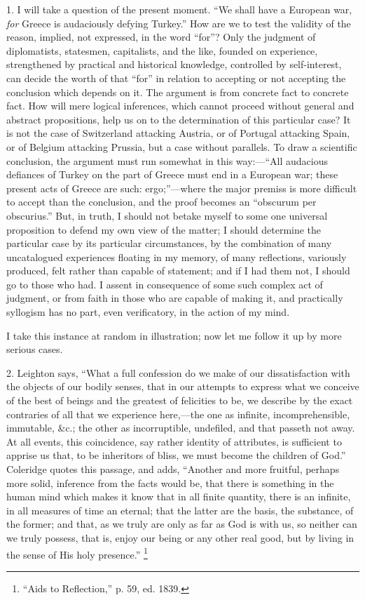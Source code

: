 1. I will take a question of the present moment. ``We shall
have a European war, \emph{for} Greece is audaciously defying Turkey.''
How are we to test the validity of the reason, implied, not expressed,
in the word ``for''? Only the judgment of diplomatists,
statesmen, capitalists, and the like, founded on experience,
strengthened by practical and historical knowledge, controlled by
self-interest, can decide the worth of that ``for'' in
relation to accepting or not accepting the conclusion which depends on
it. The argument is from concrete fact to concrete fact. How will mere
logical inferences, which cannot proceed without general and abstract
propositions, help us on to the determination of this particular case?
It is not the case of Switzerland attacking Austria, or of
Portugal attacking Spain, or of Belgium attacking Prussia, but a case
without parallels. To draw a scientific conclusion, the argument must
run somewhat in this way:—``All audacious defiances of Turkey on
the part of Greece must end in a European war; these present acts of
Greece are such: ergo;''—where the major premiss is more
difficult to accept than the conclusion, and the proof becomes an
``obscurum per obscurius.'' But, in truth, I should not betake
myself to some one universal proposition to defend my own view of the
matter; I should determine the particular case by its particular
circumstances, by the combination of many uncatalogued experiences
floating in my memory, of many reflections, variously produced, felt
rather than capable of statement; and if I had them not, I should go
to those who had. I assent in consequence of some such complex act of
judgment, or from faith in those who are capable of making it, and
practically syllogism has no part, even verificatory, in the action of
my mind.

I take this instance at random in illustration; now let me follow
it up by more serious cases.

2. Leighton says, ``What a full confession do we make of our
dissatisfaction with the objects of our bodily senses, that in our
attempts to express what we conceive of the best of beings and the
greatest of felicities to be, we describe by the exact contraries of
all that we experience here,—the one as infinite, incomprehensible,
immutable, \&c.; the other as incorruptible, undefiled, and that
passeth not away. At all events, this coincidence, say rather identity
of attributes, is sufficient to apprise us that, to be
inheritors of bliss, we must become the children of God.''
Coleridge quotes this passage, and adds, ``Another and more
fruitful, perhaps more solid, inference from the facts would be, that
there is something in the human mind which makes it know that in all
finite quantity, there is an infinite, in all measures of time an
eternal; that the latter are the basis, the substance, of the former;
and that, as we truly are only as far as God is with us, so neither
can we truly possess, that is, enjoy our being or any other real good,
but by living in the sense of His holy presence.'' \footnote{``Aids to Reflection,'' p. 59, ed. 1839.}

